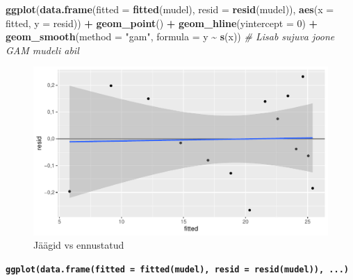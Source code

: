 \documentclass[
]{book}
\newenvironment{Shaded}{\begin{snugshade}}{\end{snugshade}}
\newcommand{\AttributeTok}[1]{\textcolor[rgb]{0.13,0.29,0.53}{#1}}
\newcommand{\CommentTok}[1]{\textcolor[rgb]{0.56,0.35,0.01}{\textit{#1}}}
\newcommand{\DecValTok}[1]{\textcolor[rgb]{0.00,0.00,0.81}{#1}}
\newcommand{\FunctionTok}[1]{\textcolor[rgb]{0.13,0.29,0.53}{\textbf{#1}}}
\newcommand{\NormalTok}[1]{#1}
\newcommand{\SpecialCharTok}[1]{\textcolor[rgb]{0.81,0.36,0.00}{\textbf{#1}}}
\newcommand{\StringTok}[1]{\textcolor[rgb]{0.31,0.60,0.02}{#1}}
\renewenvironment{Shaded} {\begin{snugshade}\footnotesize} {\end{snugshade}}
\theoremstyle{definition}
\theoremstyle{definition}
\theoremstyle{definition}
\theoremstyle{definition}
\theoremstyle{remark}
\begin{document}
\begin{Shaded}
\begin{Highlighting}[]
\FunctionTok{ggplot}\NormalTok{(}\FunctionTok{data.frame}\NormalTok{(}\AttributeTok{fitted =} \FunctionTok{fitted}\NormalTok{(mudel), }\AttributeTok{resid =} \FunctionTok{resid}\NormalTok{(mudel)),}
       \FunctionTok{aes}\NormalTok{(}\AttributeTok{x =}\NormalTok{ fitted, }\AttributeTok{y =}\NormalTok{ resid)) }\SpecialCharTok{+}
  \FunctionTok{geom\_point}\NormalTok{() }\SpecialCharTok{+}
  \FunctionTok{geom\_hline}\NormalTok{(}\AttributeTok{yintercept =} \DecValTok{0}\NormalTok{) }\SpecialCharTok{+}
  \FunctionTok{geom\_smooth}\NormalTok{(}\AttributeTok{method =} \StringTok{"gam"}\NormalTok{, }\AttributeTok{formula =}\NormalTok{ y }\SpecialCharTok{\textasciitilde{}} \FunctionTok{s}\NormalTok{(x))  }\CommentTok{\# Lisab sujuva joone GAM mudeli abil}
\end{Highlighting}
\end{Shaded}

\begin{figure}[H]
\includegraphics[width=0.8\linewidth]{_main_files/figure-latex/unnamed-chunk-54-1} \caption{Jäägid vs ennustatud}\label{fig:unnamed-chunk-54}
\end{figure}

\textbf{\texttt{ggplot(data.frame(fitted\ =\ fitted(mudel),\ resid\ =\ resid(mudel)),\ ...)}}
\end{document}
